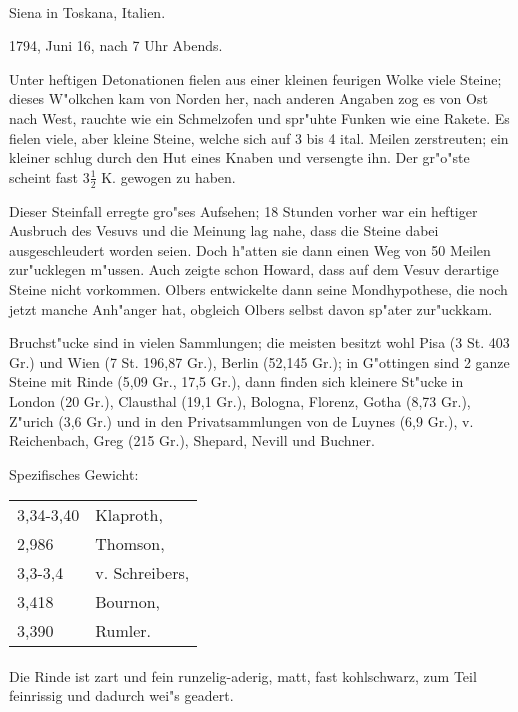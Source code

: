 \documentclass[a4paper, 11pt, oneside]{article}
\begin{document}
\paragraph{}
Siena in Toskana, Italien.

1794, Juni 16, nach 7 Uhr Abends.

Unter heftigen Detonationen fielen aus einer kleinen feurigen Wolke viele Steine; dieses W"olkchen kam von Norden her, nach anderen Angaben zog es von Ost nach West, rauchte wie ein Schmelzofen und spr"uhte Funken wie eine Rakete. Es fielen viele, aber kleine Steine, welche sich auf 3 bis 4 ital. Meilen zerstreuten; ein kleiner schlug durch den Hut eines Knaben und versengte ihn. Der gr"o"ste scheint fast $3\frac{1}{2}$ K. gewogen zu haben.

Dieser Steinfall erregte gro"ses Aufsehen; 18 Stunden vorher war ein heftiger Ausbruch des Vesuvs und die Meinung lag nahe, dass die Steine dabei ausgeschleudert worden seien. Doch h"atten sie dann einen Weg von 50 Meilen zur"ucklegen m"ussen. Auch zeigte schon Howard, dass auf dem Vesuv derartige Steine nicht vorkommen. Olbers entwickelte dann seine Mondhypothese, die noch jetzt manche Anh"anger hat, obgleich Olbers selbst davon sp"ater zur"uckkam.

Bruchst"ucke sind in vielen Sammlungen; die meisten besitzt wohl Pisa (3 St. 403 Gr.) und Wien (7 St. 196,87 Gr.), Berlin (52,145 Gr.); in G"ottingen sind 2 ganze Steine mit Rinde (5,09 Gr., 17,5 Gr.), dann finden sich kleinere St"ucke in London (20 Gr.), Clausthal (19,1 Gr.), Bologna, Florenz, Gotha (8,73 Gr.), Z"urich (3,6 Gr.) und in den Privatsammlungen von de Luynes (6,9 Gr.), v. Reichenbach, Greg (215 Gr.), Shepard, Nevill und Buchner.

Spezifisches Gewicht:
\begin{table}[!ht]
    \centering
    \begin{tabular}{l l}
        3,34-3,40 & Klaproth,\\
        2,986 & Thomson,\\
        3,3-3,4 & v. Schreibers,\\
        3,418 & Bournon,\\
        3,390 & Rumler.
    \end{tabular}
\end{table}
\paragraph{}
Die Rinde ist zart und fein runzelig-aderig, matt, fast kohlschwarz, zum Teil feinrissig und dadurch wei"s geadert.
\end{document}
